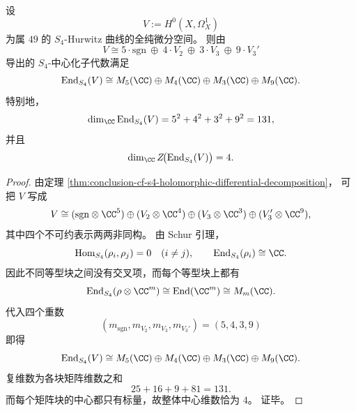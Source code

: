\begin{theorem}\label{thm:conclusion-s4-schur-centralizer-closed-form}
设
\[
V:=H^0(X,\Omega_X^1)
\]
为属 \(49\) 的 \(S_4\)-Hurwitz 曲线的全纯微分空间。
则由
\[
V\cong
5\cdot \mathrm{sgn}\ \oplus\ 4\cdot V_2\ \oplus\ 3\cdot V_3\ \oplus\ 9\cdot V_3'
\]
导出的 \(S_4\)-中心化子代数满足
\[
\operatorname{End}_{S_4}(V)
\cong
M_5(\CC)\oplus M_4(\CC)\oplus M_3(\CC)\oplus M_9(\CC).
\]
特别地，
\[
\dim_{\CC}\operatorname{End}_{S_4}(V)
=
5^2+4^2+3^2+9^2
=131,
\]
并且
\[
\dim_{\CC}Z\!\bigl(\operatorname{End}_{S_4}(V)\bigr)=4.
\]
\end{theorem}
\begin{proof}
由定理 \ref{thm:conclusion-cf-s4-holomorphic-differential-decomposition}，
可把 \(V\) 写成
\[
V\cong
(\mathrm{sgn}\otimes \CC^5)\oplus
(V_2\otimes \CC^4)\oplus
(V_3\otimes \CC^3)\oplus
(V_3'\otimes \CC^9),
\]
其中四个不可约表示两两非同构。
由 Schur 引理，
\[
\operatorname{Hom}_{S_4}(\rho_i,\rho_j)=0\quad(i\neq j),
\qquad
\operatorname{End}_{S_4}(\rho_i)\cong \CC.
\]
因此不同等型块之间没有交叉项，而每个等型块上都有
\[
\operatorname{End}_{S_4}(\rho\otimes \CC^m)
\cong
\operatorname{End}(\CC^m)
\cong
M_m(\CC).
\]
代入四个重数
\[
(m_{\mathrm{sgn}},m_{V_2},m_{V_3},m_{V_3'})=(5,4,3,9)
\]
即得
\[
\operatorname{End}_{S_4}(V)
\cong
M_5(\CC)\oplus M_4(\CC)\oplus M_3(\CC)\oplus M_9(\CC).
\]
复维数为各块矩阵维数之和
\[
25+16+9+81=131.
\]
而每个矩阵块的中心都只有标量，故整体中心维数恰为 \(4\)。
证毕。
\end{proof}

